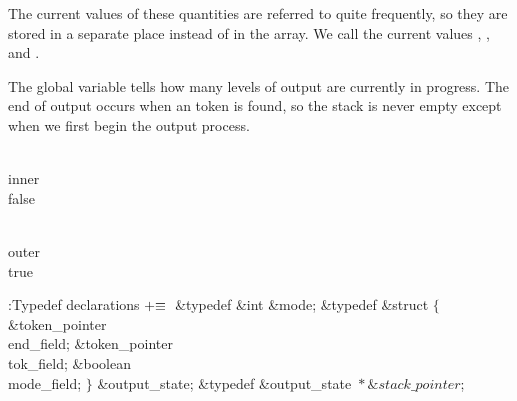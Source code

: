 \yskip\noindent The current values of these quantities are referred to
quite frequently, so they are stored in a separate place instead of in the
 array. We call the current values , , and
.

The global variable  tells how many levels of output are
currently in progress. The end of output occurs when an 
token is found, so the stack is never empty except when we first begin the
output process.

\Y\B\4\D\\{inner}\5
\\{false}\par
\B\4\D\\{outer}\5
\\{true}\par
\Y\B\4:Typedef declarations\X${}\mathrel+\equiv{}$\6
\&{typedef} \&{int} \&{mode};\6
\&{typedef} \&{struct} ${}\{{}$\1\6
\&{token\_pointer} \\{end\_field};\6
\&{token\_pointer} \\{tok\_field};\6
\&{boolean} \\{mode\_field};\2\6
${}\}{}$ \&{output\_state};\6
\&{typedef} \&{output\_state} ${}{*}\&{stack\_pointer}{}$;\par
\fi

